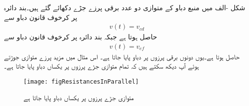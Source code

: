 شکل -الف میں منبع دباو کے متوازی دو عدد برقی پرزے جڑے دکھائے گئے ہیں۔بند دائرہ  پر کرخوف قانون دباو سے
\begin{align}
v(t)=v_{cd}
\end{align}
حاصل ہوتا ہے جبکہ بند دائرہ  پر کرخوف  قانون دباو سے
\begin{align}
v(t)=v_{ef}
\end{align}
حاصل ہوتا ہے۔یوں دونوں برقی پرزوں پر  دباو پایا جاتا ہے۔ اس مثال میں مزید پرزے متوازی جوڑتے ہوئے آپ دیکھ سکتے ہیں کہ تمام متوازی جڑے پرزوں پر یکساں دباو پایا جاتا ہے۔
\begin{figure}
\centering
\texttt{[image: figResistancesInParallel]}
\caption{متوازی جڑے پرزوں پر یکساں دباو پایا جاتا ہے}
\label{شکل_مزاحمتی_متوازی_جڑے_پرزے}
\end{figure}

